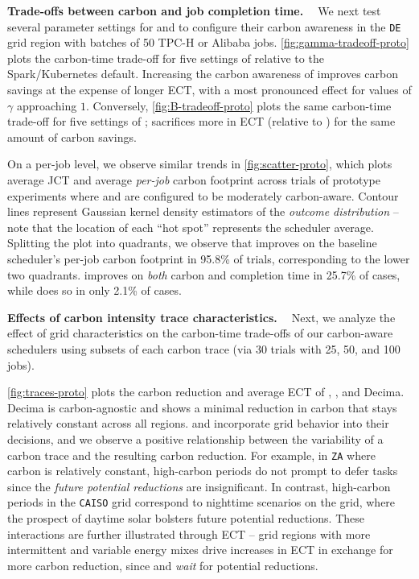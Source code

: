 \noindent \textbf{Trade-offs between carbon and job completion time. \ }
We next test several parameter settings for \DANISH and \CAP to configure their carbon awareness in the \verb|DE| grid region with batches of 50 TPC-H or Alibaba jobs.  
\autoref{fig:gamma-tradeoff-proto} plots the carbon-time trade-off for five settings of \DANISH relative to the Spark/Kubernetes default.
Increasing the carbon awareness of \DANISH improves carbon savings at the expense of longer ECT, with a most pronounced effect for values of $\gamma$ approaching $1$.  
Conversely, \autoref{fig:B-tradeoff-proto} plots the same carbon-time trade-off for five settings of \CAP; \CAP sacrifices more in ECT (relative to \DANISH) for the same amount of carbon savings.



On a per-job level, we observe similar trends in \autoref{fig:scatter-proto}, which plots average JCT and average \textit{per-job} carbon footprint across trials of prototype experiments where \DANISH and \CAP are configured to be moderately carbon-aware.  Contour lines represent Gaussian kernel density estimators of the \textit{outcome distribution} -- note that the location of each ``hot spot'' represents the scheduler average.  Splitting the plot into quadrants, we observe that \DANISH improves on the baseline scheduler's per-job carbon footprint in 95.8\% of trials, corresponding to the lower two quadrants.  \DANISH improves on \textit{both} carbon and completion time in 25.7\% of cases, while \CAP does so in only 2.1\% of cases. 








\noindent \textbf{Effects of carbon intensity trace characteristics. \ }
Next, we analyze the effect of grid characteristics on the carbon-time trade-offs of our carbon-aware schedulers using subsets of each carbon trace (via 30 trials with 25, 50, and 100 jobs).

\autoref{fig:traces-proto} plots the carbon reduction and average ECT of \DANISH, \CAP, and Decima.  
Decima is carbon-agnostic and shows a minimal reduction in carbon that stays relatively constant across all regions.  \DANISH and \CAP incorporate grid behavior into their decisions, and we observe a positive relationship between the variability of a carbon trace and the resulting carbon reduction.
For example, in \verb|ZA| where carbon is relatively constant, high-carbon periods do not prompt \DANISH to defer tasks since the \textit{future potential reductions} are insignificant.  
In contrast, high-carbon periods in the \verb|CAISO| grid correspond to nighttime scenarios on the grid, where the prospect of daytime solar bolsters future potential reductions.
These interactions are further illustrated through ECT -- grid regions with more intermittent and variable energy mixes drive increases in ECT in exchange for more carbon reduction, since \DANISH and \CAP \textit{wait} for potential reductions.


